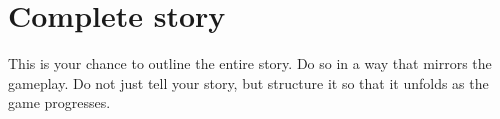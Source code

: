 \section{Complete story}%
This is your chance to outline the entire story. Do so in a way that mirrors the
gameplay. Do not just tell your story, but structure it so that it unfolds as
the game progresses.